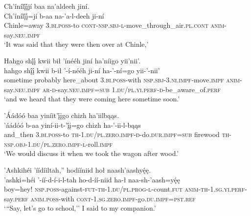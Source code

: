 \ea\label{ex:text1-11-6}
Ch’ínílį́į́jí baa na’aldeeh jiní.\\
\gll Ch’ínílį́į́=jí	b-aa	na-’a-l-deeh	ji-ní\\
     Chinle=away	3.\textsc{bi}.\textsc{poss}-to	\textsc{cont}-\textsc{nsp}.\textsc{sbj}-\textsc{l}-move\_through\_air.\textsc{pl}.\textsc{cont}	\textsc{anim}-say.\textsc{neu}.\textsc{impf}\\
\glt `It was said that they were then over at Chinle,'
\z

\ea\label{ex:text1-11-7}
Hahgo shį́į́ kwii bił ’ínééh jiní ha’níigo yii’nii’.\\
\gll hahgo	shį́į́	kwii	b-ił	’-í-nééh	ji-ní	ha-’-ní=go	yii-’-nii’\\
     sometime	probably	here\_about	3.\textsc{bi}.\textsc{poss}-with	\textsc{nsp}.\textsc{sbj}-3.\textsc{ni}.\textsc{impf}-move.\textsc{impf}	\textsc{anim}-say.\textsc{neu}.\textsc{impf}	\textsc{ar}-\textsc{d}-say.\textsc{neu}.\textsc{impf}=\textsc{sub}	1.\textsc{du}/\textsc{pl}.\textsc{yi}.\textsc{perf}-\textsc{d}-be\_aware\_of.\textsc{perf}\\
\glt `and we heard that they were coming here sometime soon.'
\z

\ea\label{ex:text1-11-8}
’Áádóó baa yiníit’į́įgo chizh ha’iilbąąs.\\
\gll ’áádóó	b-aa	yiní-ii-t-’į́į=go	chizh	ha-’-ii-l-bąąs\\
     and\_then	3.\textsc{bi}.\textsc{poss}-to	\textsc{th}-1.\textsc{du}/\textsc{pl}.\textsc{zero}.\textsc{impf}-\textsc{d}-do.\textsc{dur}.\textsc{impf}=\textsc{sub}	firewood	\textsc{th}-\textsc{nsp}.\textsc{obj}-1.\textsc{du}/\textsc{pl}.\textsc{zero}.\textsc{impf}-\textsc{l}-roll.\textsc{impf}\\
\glt `We would discuss it when we took the wagon after wood.'
\z

\ea\label{ex:text1-12}
’Ashkihéi ’íídíiltah,'' hodííniid hoł naash’aashyę́ę.\\
\gll ’ashki=héi	’-íí-d-í-i-l-tah	ho-d-íí-niid	ha-ł	naa-sh-’aash=yę́ę\\
     boy=hey!	\textsc{nsp}.\textsc{poss}-against-\textsc{fut}-\textsc{th}-1.\textsc{du}/\textsc{pl}.\textsc{prog}-\textsc{l}-count.\textsc{fut}	\textsc{anim}-\textsc{th}-1.\textsc{sg}.\textsc{yi}.\textsc{perf}-say.\textsc{perf}	\textsc{anim}.\textsc{poss}-with	\textsc{cont}-1.\textsc{sg}.\textsc{zero}.\textsc{impf}-go.\textsc{du}.\textsc{impf}=\textsc{pst}.\textsc{ref}\\
\glt `{``}Say, let's go to school,'' I said to my companion.'
\z

